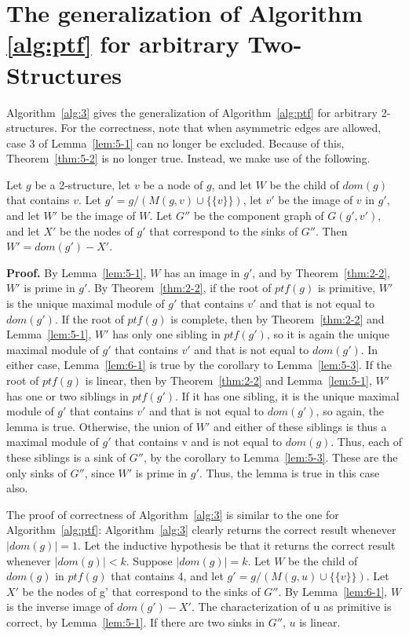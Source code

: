 \section{The generalization of Algorithm \ref{alg:ptf} for arbitrary Two-Structures}\label{sec:the-generalization-of-algorithmref{alg:ptf}-for-arbitrary-2-structures}

Algorithm~\ref{alg:3} gives the generalization of Algorithm~\ref{alg:ptf} for arbitrary 2-structures.
For the correctness, note that when asymmetric edges are allowed, case 3 of Lemma~\ref{lem:5-1} can no longer be excluded.
Because of this, Theorem~\ref{thm:5-2} is no longer true.
Instead, we make use of the following.

\begin{mylem}
    \label{lem:6-1}
    Let $g$ be a 2-structure, let $v$ be a node of $g$, and let $W$ be the child of $dom(g)$ that contains $v$.
    Let $g' = g / (M(g, v) \cup \{\{v\}\})$, let $v'$ be the image of $v$ in $g'$, and let $W'$ be the image of $W$.
    Let $G''$ be the component graph of $G(g', v')$, and let $X'$ be the nodes of $g'$ that correspond to the sinks of $G''$.
    Then $W' = dom(g') - X'$.
\end{mylem}

\textbf{Proof.}
By Lemma~\ref{lem:5-1}, $W$ has an image in $g'$, and by Theorem~\ref{thm:2-2}, $W'$ is prime in $g'$.
By Theorem~\ref{thm:2-2}, if the root of $ptf(g)$ is primitive, $W'$ is the unique maximal module of $g'$ that contains $v'$ and that is not equal to $dom(g')$.
If the root of $ptf(g)$ is complete, then by Theorem~\ref{thm:2-2} and Lemma~\ref{lem:5-1}, $W'$ has only one sibling in $ptf(g')$, so it is again the unique maximal module of $g'$ that contains $v'$ and that is not equal to $dom(g')$.
In either case, Lemma~\ref{lem:6-1} is true by the corollary to Lemma~\ref{lem:5-3}.
If the root of $ptf(g)$ is linear, then by Theorem~\ref{thm:2-2} and Lemma~\ref{lem:5-1}, $ W'$ has one or two siblings in $ptf(g')$.
If it has one sibling, it is the unique maximal module of $g'$ that contains $v'$ and that is not equal to $dom(g')$, so again, the lemma is true.
Otherwise, the union of $W'$ and either of these siblings is thus a maximal module of $g'$ that contains v and is not equal to $dom(g)$.
Thus, each of these siblings is a sink of $G''$, by the corollary to Lemma~\ref{lem:5-3}.
These are the only sinks of $G''$, since $W'$ is prime in $g'$.
Thus, the lemma is true in this case also.


The proof of correctness of Algorithm~\ref{alg:3} is similar to the one for Algorithm~\ref{alg:ptf}: Algorithm~\ref{alg:3} clearly returns the correct result whenever $\mid dom(g) \mid = 1$.
Let the inductive hypothesis be that it returns the correct result whenever $\mid dom(g) \mid < k$.
Suppose $\mid dom(g) \mid = k$.
Let $W$ be the child of $dom(g)$ in $ptf(g)$ that contains 4, and let $g' = g/(M(g, u) \cup \{\{v\}\})$.
Let $X'$ be the nodes of g' that correspond to the sinks of $G''$.
By Lemma~\ref{lem:6-1}, $W$ is the inverse image of $dom(g') - X'$.
The characterization of u as primitive is correct, by Lemma~\ref{lem:5-1}.
If there are two sinks in $G''$, $u$ is linear.

